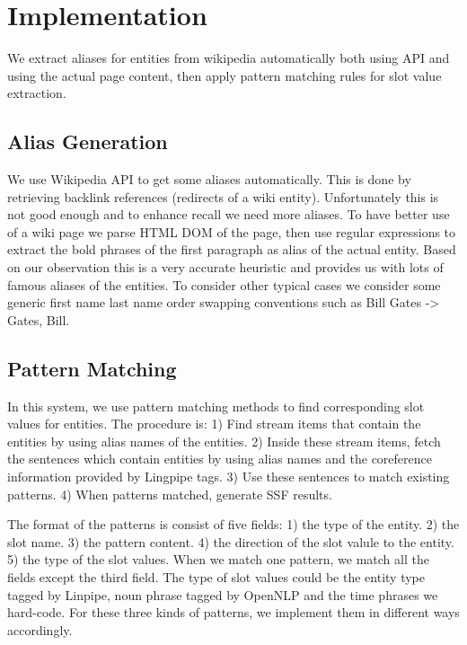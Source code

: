 

\section{Implementation}

We extract aliases for entities from wikipedia automatically both using API and using the actual page content, then apply pattern matching rules for slot value extraction. 

\subsection{Alias Generation}

We use Wikipedia API to get some aliases automatically. This is done by retrieving backlink references (redirects of a wiki entity). Unfortunately this is not good enough and to enhance recall we need more aliases. To have better use of a wiki page we parse HTML DOM of the page, then use regular expressions to extract the bold phrases of the first paragraph as alias of the actual entity. Based on our observation this is a very accurate heuristic and provides us with lots of famous aliases of the entities. To consider other typical cases we consider some generic first name last name order swapping conventions such as Bill Gates -> Gates, Bill.  

\subsection{Pattern Matching}

In this system, we use pattern matching methods to find corresponding slot values for entities. The procedure is: 1) Find stream items that contain the entities by using alias names of the entities. 2) Inside these stream items, fetch the sentences which contain entities by using alias names and the coreference information provided by Lingpipe tags. 3) Use these sentences to match existing patterns. 4) When patterns matched, generate SSF results.

The format of the patterns is consist of five fields: 1) the type of the entity. 2) the slot name. 3) the pattern content. 4) the direction of the slot valule to the entity. 5) the type of the slot values. When we match one pattern, we match all the fields except the third field. The type of slot values could be the entity type tagged by Linpipe, noun phrase tagged by OpenNLP and the time phrases we hard-code. For these three kinds of patterns, we implement them in different ways accordingly. 

